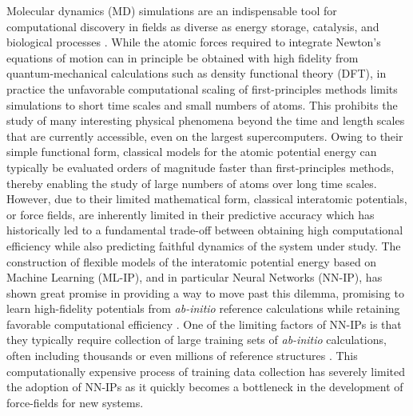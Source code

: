 \documentclass[%
reprint,
superscriptaddress,
nofootinbib,
amsmath,amssymb,
aps,
prl,
]{revtex4-1}
\begin{document}
Molecular dynamics (MD) simulations are an indispensable tool for computational discovery in fields as diverse as energy storage, catalysis, and biological processes \cite{richards2016design, boero1998first, lindorff2011fast}. While the atomic forces required to integrate Newton's equations of motion can in principle be obtained with high fidelity from quantum-mechanical calculations such as density functional theory (DFT), in practice the unfavorable computational scaling of first-principles methods limits simulations to short time scales and small numbers of atoms. This prohibits the study of many interesting physical phenomena beyond the time and length scales that are currently accessible, even on the largest supercomputers. Owing to their simple functional form, classical models for the atomic potential energy can typically be evaluated orders of magnitude faster than first-principles methods, thereby enabling the study of large numbers of atoms over long time scales. However, due to their limited mathematical form, classical interatomic potentials, or force fields, are inherently limited in their predictive accuracy which has historically led to a fundamental trade-off between obtaining high computational efficiency while also predicting faithful dynamics of the system under study. The construction of flexible models of the interatomic potential energy based on Machine Learning (ML-IP), and in particular Neural Networks (NN-IP), has shown great promise in providing a way to move past this dilemma, promising to learn high-fidelity potentials from \textit{ab-initio} reference calculations  while retaining favorable computational efficiency \cite{behler2007generalized, gaporiginalpaper, shapeev2016moment, thompson2015spectral, vandermause2020fly, schnet_neurips, physnet_jctc, klicpera2020directional, dcf, gnnff}. One of the limiting factors of NN-IPs is that they typically require collection of large training sets of \textit{ab-initio} calculations, often including thousands or even millions of reference structures \cite{behler2007generalized, artrith2014understanding, schnet_neurips, deepmd, physnet_jctc, smith2017ani}. This computationally expensive process of training data collection has severely limited the adoption of NN-IPs as it quickly becomes a bottleneck in the development of force-fields for new systems. \\
\end{document}
